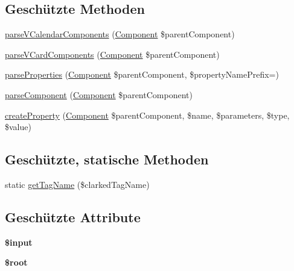 \subsection*{Geschützte Methoden}
\begin{DoxyCompactItemize}
\item 
\mbox{\hyperlink{class_sabre_1_1_v_object_1_1_parser_1_1_x_m_l_a7d3e677c26e77a6551ae9201a81f5e24}{parse\+V\+Calendar\+Components}} (\mbox{\hyperlink{class_sabre_1_1_v_object_1_1_component}{Component}} \$parent\+Component)
\item 
\mbox{\hyperlink{class_sabre_1_1_v_object_1_1_parser_1_1_x_m_l_a880ce5881f9b9bc421a79d4d7a541be3}{parse\+V\+Card\+Components}} (\mbox{\hyperlink{class_sabre_1_1_v_object_1_1_component}{Component}} \$parent\+Component)
\item 
\mbox{\hyperlink{class_sabre_1_1_v_object_1_1_parser_1_1_x_m_l_ad14db36a39b7ba2371b5bfe7a824c3f3}{parse\+Properties}} (\mbox{\hyperlink{class_sabre_1_1_v_object_1_1_component}{Component}} \$parent\+Component, \$property\+Name\+Prefix=\textquotesingle{}\textquotesingle{})
\item 
\mbox{\hyperlink{class_sabre_1_1_v_object_1_1_parser_1_1_x_m_l_a10b72f203487ace48b53a9bc8088268a}{parse\+Component}} (\mbox{\hyperlink{class_sabre_1_1_v_object_1_1_component}{Component}} \$parent\+Component)
\item 
\mbox{\hyperlink{class_sabre_1_1_v_object_1_1_parser_1_1_x_m_l_a1538c5a6a5619b701bf6bf5a1e7182f3}{create\+Property}} (\mbox{\hyperlink{class_sabre_1_1_v_object_1_1_component}{Component}} \$parent\+Component, \$name, \$parameters, \$type, \$value)
\end{DoxyCompactItemize}
\subsection*{Geschützte, statische Methoden}
\begin{DoxyCompactItemize}
\item 
static \mbox{\hyperlink{class_sabre_1_1_v_object_1_1_parser_1_1_x_m_l_a1fc350d905dae632556bf9226621b5fd}{get\+Tag\+Name}} (\$clarked\+Tag\+Name)
\end{DoxyCompactItemize}
\subsection*{Geschützte Attribute}
\begin{DoxyCompactItemize}
\item 
\mbox{\label{class_sabre_1_1_v_object_1_1_parser_1_1_x_m_l_a620466f73a4d9726c2ef564b75e436e8}} 
{\bfseries \$input}
\item 
\mbox{\label{class_sabre_1_1_v_object_1_1_parser_1_1_x_m_l_aa7ad50ac5f4feba05c9a6dffa7b85f0c}} 
{\bfseries \$root}
\end{DoxyCompactItemize}


